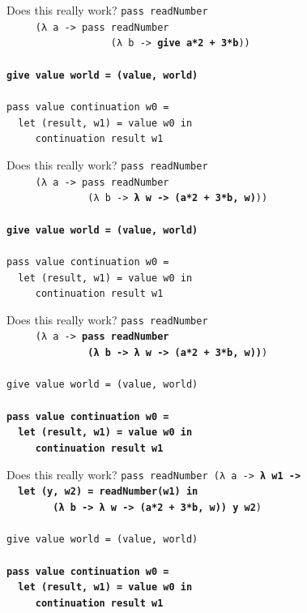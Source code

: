 \documentclass{beamer}
\begin{document}
\begin{frame}{Does this really work?}
  \texttt{pass readNumber\\
    \ \ \ \ \ (λ a -> pass readNumber\\
    \ \ \ \ \ \ \ \ \ \ \ \ \ \ \ \ \ \ (λ b -> \textbf{give a*2 + 3*b}))\\
    \ \\ \pause
    \textbf{give value world = (value, world)} \\ \pause
    \ \\
    pass value continuation w0 = \\
    \ \ let (result, w1) = value w0 in \\
    \ \ \ \ \ continuation result w1
  }
\end{frame}

\begin{frame}{Does this really work?}
  \texttt{pass readNumber\\
    \ \ \ \ \ (λ a -> pass readNumber\\
    \ \ \ \ \ \ \ \ \ \ \ \ \ \ (λ b -> \textbf{λ w -> (a*2 + 3*b, w)}))\\
    \ \\
    \textbf{give value world = (value, world)} \\
    \ \\
    pass value continuation w0 = \\
    \ \ let (result, w1) = value w0 in \\
    \ \ \ \ \ continuation result w1
  }
\end{frame}

\begin{frame}{Does this really work?}
  \texttt{pass readNumber\\
    \ \ \ \ \ (λ a -> \textbf{pass readNumber\\
      \ \ \ \ \ \ \ \ \ \ \ \ \ \ (λ b -> λ w -> (a*2 + 3*b, w))})\\
    \ \\
    give value world = (value, world) \\
    \ \\
    \textbf{pass value continuation w0 = \\
      \ \ let (result, w1) = value w0 in \\
      \ \ \ \ \ continuation result w1}
  }
\end{frame}

\begin{frame}{Does this really work?}
  \texttt{pass readNumber (λ a -> \textbf{λ w1 -> \\
      \ \ let (y, w2) = readNumber(w1) in\\
      \ \ \ \ \ \ \ \ (λ b -> λ w -> (a*2 + 3*b, w)) y w2})\\
    \ \\
    give value world = (value, world) \\
    \ \\
    \textbf{pass value continuation w0 = \\
      \ \ let (result, w1) = value w0 in \\
      \ \ \ \ \ continuation result w1}
  }
\end{frame}
\end{document}
